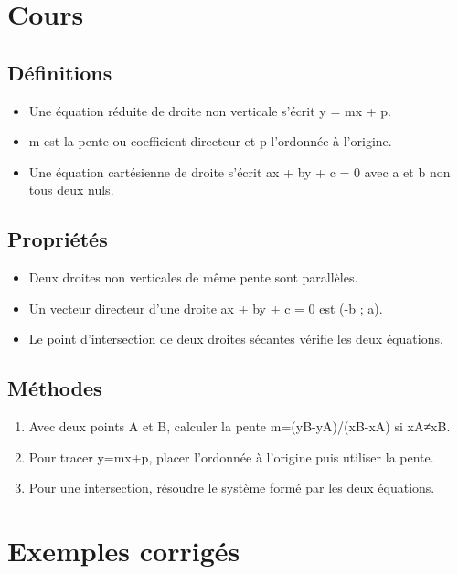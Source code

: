 \section{Cours}

\subsection{Définitions}

\begin{itemize}
\item Une équation réduite de droite non verticale s'écrit y = mx + p.
\item m est la pente ou coefficient directeur et p l'ordonnée à l'origine.
\item Une équation cartésienne de droite s'écrit ax + by + c = 0 avec a et b non tous deux nuls.
\end{itemize}

\subsection{Propriétés}

\begin{itemize}
\item Deux droites non verticales de même pente sont parallèles.
\item Un vecteur directeur d'une droite ax + by + c = 0 est (-b ; a).
\item Le point d'intersection de deux droites sécantes vérifie les deux équations.
\end{itemize}

\subsection{Méthodes}

\begin{enumerate}
\item Avec deux points A et B, calculer la pente m=(yB-yA)/(xB-xA) si xA≠xB.
\item Pour tracer y=mx+p, placer l'ordonnée à l'origine puis utiliser la pente.
\item Pour une intersection, résoudre le système formé par les deux équations.
\end{enumerate}

\section{Exemples corrigés}

